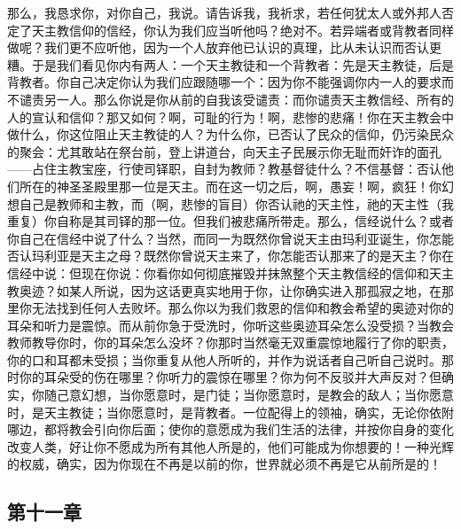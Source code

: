 那么，我恳求你，对你自己，我说。请告诉我，我祈求，若任何犹太人或外邦人否定了天主教信仰的信经，你认为我们应当听他吗？绝对不。若异端者或背教者同样做呢？我们更不应听他，因为一个人放弃他已认识的真理，比从未认识而否认更糟。于是我们看见你内有两人：一个天主教徒和一个背教者：先是天主教徒，后是背教者。你自己决定你认为我们应跟随哪一个：因为你不能强调你内一人的要求而不谴责另一人。那么你说是你从前的自我该受谴责：而你谴责天主教信经、所有的人的宣认和信仰？那又如何？啊，可耻的行为！啊，悲惨的悲痛！你在天主教会中做什么，你这位阻止天主教徒的人？为什么你，已否认了民众的信仰，仍污染民众的聚会：尤其敢站在祭台前，登上讲道台，向天主子民展示你无耻而奸诈的面孔——占住主教宝座，行使司铎职，自封为教师？教基督徒什么？不信基督：否认他们所在的神圣圣殿里那一位是天主。而在这一切之后，啊，愚妄！啊，疯狂！你幻想自己是教师和主教，而（啊，悲惨的盲目）你否认祂的天主性，祂的天主性（我重复）你自称是其司铎的那一位。但我们被悲痛所带走。那么，信经说什么？或者你自己在信经中说了什么？当然，而同一为既然你曾说天主由玛利亚诞生，你怎能否认玛利亚是天主之母？既然你曾说天主来了，你怎能否认那来了的是天主？你在信经中说：但现在你说：你看你如何彻底摧毁并抹煞整个天主教信经的信仰和天主教奥迹？如某人所说，因为这话更真实地用于你，让你确实进入那孤寂之地，在那里你无法找到任何人去败坏。那么你以为我们救恩的信仰和教会希望的奥迹对你的耳朵和听力是震惊。而从前你急于受洗时，你听这些奥迹耳朵怎么没受损？当教会教师教导你时，你的耳朵怎么没坏？你那时当然毫无双重震惊地履行了你的职责，你的口和耳都未受损；当你重复从他人所听的，并作为说话者自己听自己说时。那时你的耳朵受的伤在哪里？你听力的震惊在哪里？你为何不反驳并大声反对？但确实，你随己意幻想，当你愿意时，是门徒；当你愿意时，是教会的敌人；当你愿意时，是天主教徒；当你愿意时，是背教者。一位配得上的领袖，确实，无论你依附哪边，都将教会引向你后面；使你的意愿成为我们生活的法律，并按你自身的变化改变人类，好让你不愿成为所有其他人所是的，他们可能成为你想要的！一种光辉的权威，确实，因为你现在不再是以前的你，世界就必须不再是它从前所是的！\par


\subsection{第十一章}


